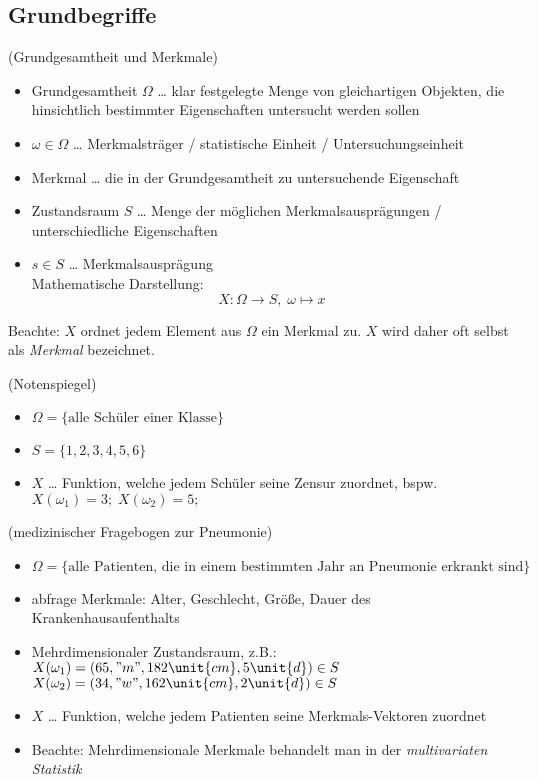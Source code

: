 \subsection{Grundbegriffe}
 (Grundgesamtheit und Merkmale)
\begin{itemize}
\item Grundgesamtheit $\Omega$ … klar festgelegte Menge von gleichartigen Objekten, die hinsichtlich bestimmter Eigenschaften untersucht werden sollen
\item $\omega \in \Omega$ … Merkmalsträger / statistische Einheit / Untersuchungseinheit
\item Merkmal … die in der Grundgesamtheit zu untersuchende Eigenschaft
\item Zustandsraum $S$ … Menge der möglichen Merkmalsausprägungen / unterschiedliche Eigenschaften
\item $s \in S$ … Merkmalsausprägung\\
Mathematische Darstellung:
$$X: \Omega \to S, \; \omega \mapsto x$$
\end{itemize}
Beachte: $X$ ordnet jedem Element aus $\Omega$ ein Merkmal zu. $X$ wird daher oft selbst als \emph{Merkmal} bezeichnet.

 (Notenspiegel)
\begin{itemize}
\item $\Omega = \{ \text{alle Schüler einer Klasse}\}$
\item $S=\{1,2,3,4,5,6\}$
\item $X$ … Funktion, welche jedem Schüler seine Zensur zuordnet, bspw. $X(\omega_1) = 3; \; X(\omega_2) = 5;$
\end{itemize}

 (medizinischer Fragebogen zur Pneumonie)
\begin{itemize}
\item $\Omega = \{ \text{alle Patienten, die in einem bestimmten Jahr an Pneumonie erkrankt sind}\}$
\item abfrage Merkmale: Alter, Geschlecht, Größe, Dauer des Krankenhausaufenthalts
\item Mehrdimensionaler Zustandsraum, z.B.:\\
$X(\omega_1)=(65,"m",182\unit{cm},5\unit{d}) \in S$\\
$X(\omega_2)=(34,"w",162\unit{cm},2\unit{d}) \in S$
\item $X$ … Funktion, welche jedem Patienten seine Merkmals-Vektoren zuordnet
\item Beachte: Mehrdimensionale Merkmale behandelt man in der \emph{multivariaten Statistik}
\end{itemize}

